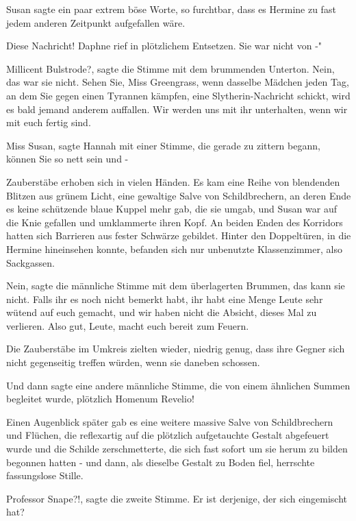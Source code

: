 Susan sagte ein paar extrem böse Worte, so furchtbar, dass es Hermine zu fast
jedem anderen Zeitpunkt aufgefallen wäre.

\glqq Diese Nachricht!\grqq{} Daphne rief in plötzlichem Entsetzen. \glqq Sie
war nicht von -"

\glqq Millicent Bulstrode?\grqq{}, sagte die Stimme mit dem brummenden Unterton.
\glqq Nein, das war sie nicht. Sehen Sie, Miss Greengrass, wenn dasselbe Mädchen
jeden Tag, an dem Sie gegen einen Tyrannen kämpfen, eine Slytherin-Nachricht
schickt, wird es bald jemand anderem auffallen. Wir werden uns mit ihr
unterhalten, wenn wir mit euch fertig sind.\grqq{}

\glqq Miss Susan\grqq{}, sagte Hannah mit einer Stimme, die gerade zu zittern
begann, \glqq können Sie so nett sein und -\grqq{}

Zauberstäbe erhoben sich in vielen Händen. Es kam eine Reihe von blendenden
Blitzen aus grünem Licht, eine gewaltige Salve von Schildbrechern, an deren Ende
es keine schützende blaue Kuppel mehr gab, die sie umgab, und Susan war auf die
Knie gefallen und umklammerte ihren Kopf. An beiden Enden des Korridors hatten
sich Barrieren aus fester Schwärze gebildet. Hinter den Doppeltüren, in die
Hermine hineinsehen konnte, befanden sich nur unbenutzte Klassenzimmer, also
Sackgassen.

\glqq Nein\grqq{}, sagte die männliche Stimme mit dem überlagerten Brummen,
\glqq das kann sie nicht. Falls ihr es noch nicht bemerkt habt, ihr habt eine
Menge Leute sehr wütend auf euch gemacht, und wir haben nicht die Absicht,
dieses Mal zu verlieren. Also gut, Leute, macht euch bereit zum Feuern.\grqq{}

Die Zauberstäbe im Umkreis zielten wieder, niedrig genug, dass ihre Gegner sich
nicht gegenseitig treffen würden, wenn sie daneben schossen.

Und dann sagte eine andere männliche Stimme, die von einem ähnlichen Summen
begleitet wurde, plötzlich \glqq Homenum Revelio!\grqq{}

Einen Augenblick später gab es eine weitere massive Salve von Schildbrechern und
Flüchen, die reflexartig auf die plötzlich aufgetauchte Gestalt abgefeuert wurde
und die Schilde zerschmetterte, die sich fast sofort um sie herum zu bilden
begonnen hatten - und dann, als dieselbe Gestalt zu Boden fiel, herrschte
fassungslose Stille.

\glqq Professor Snape?!\grqq{}, sagte die zweite Stimme. \glqq Er ist derjenige,
der sich eingemischt hat?\grqq{}

